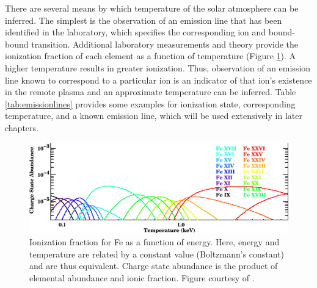 There are several means by which temperature of the solar atmosphere can be inferred. The simplest is the observation of an emission line that has been identified in the laboratory, which specifies the corresponding ion and bound-bound transition. Additional laboratory measurements and theory provide the ionization fraction of each element as a function of temperature (Figure \ref{fig:feionizationfraction}). A higher temperature results in greater ionization. Thus, observation of an emission line known to correspond to a particular ion is an indicator of that ion's existence in the remote plasma and an approximate temperature can be inferred. Table \ref{tab:emissionlines} provides some examples for ionization state, corresponding temperature, and a known emission line, which will be used extensively in later chapters. 

\begin{figure}[!h]
    \begin{center}
	    \includegraphics[width=120mm]{Images/FeIonizationFraction.png}
    \end{center}
    \caption[Fe Ionization Fraction]{
        Ionization fraction for Fe as a function of energy. Here, energy and temperature are related by a constant value 
        (Boltzmann's constant) and are thus equivalent. Charge state abundance is the product of elemental abundance and 
        ionic fraction. Figure courtesy of \citet{Peterson2006}. 
    }
    \label{fig:feionizationfraction}
\end{figure}

